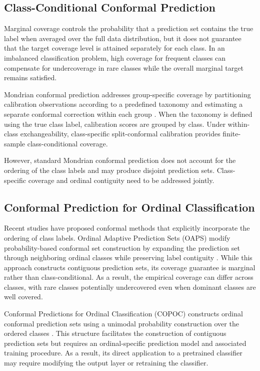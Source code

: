 \documentclass[conference]{IEEEtran}
\begin{document}
\subsection{Class-Conditional Conformal Prediction}
\label{subsec:mondrian_cp}
Marginal coverage controls the probability that a prediction set contains the true label when averaged over the full data distribution, but it does not guarantee that the target coverage level is attained separately for each class. In an imbalanced classification problem, high coverage for frequent classes can compensate for undercoverage in rare classes while the overall marginal target remains satisfied. 

Mondrian conformal prediction addresses group-specific coverage by partitioning calibration observations according to a predefined taxonomy and estimating a separate conformal correction within each group \cite{vovk2005algorithmic,vovk2012conditional}. When the taxonomy is defined using the true class label, calibration scores are grouped by class. Under within-class exchangeability, class-specific split-conformal calibration provides finite-sample class-conditional coverage.

However, standard Mondrian conformal prediction does not account for the ordering of the class labels and may produce disjoint prediction sets. Class-specific coverage and ordinal contiguity need to be addressed jointly.

\subsection{Conformal Prediction for Ordinal Classification}
\label{subsec:ordinal_cp}

Recent studies have proposed conformal methods that explicitly incorporate the ordering of class labels. Ordinal Adaptive Prediction Sets (OAPS) modify probability-based conformal set construction by expanding the prediction set through neighboring ordinal classes while preserving label contiguity \cite{lu2022oaps}. While this approach constructs contiguous prediction sets, its coverage guarantee is marginal rather than class-conditional. As a result, the empirical coverage can differ across classes, with rare classes potentially undercovered even when dominant classes are well covered.

Conformal Predictions for Ordinal Classification (COPOC) constructs ordinal conformal prediction sets using a unimodal probability construction over the ordered classes \cite{dey2023copoc}. This structure facilitates the construction of contiguous prediction sets but requires an ordinal-specific prediction model and associated training procedure. As a result, its direct application to a pretrained classifier may require modifying the output layer or retraining the classifier. 
\end{document}
